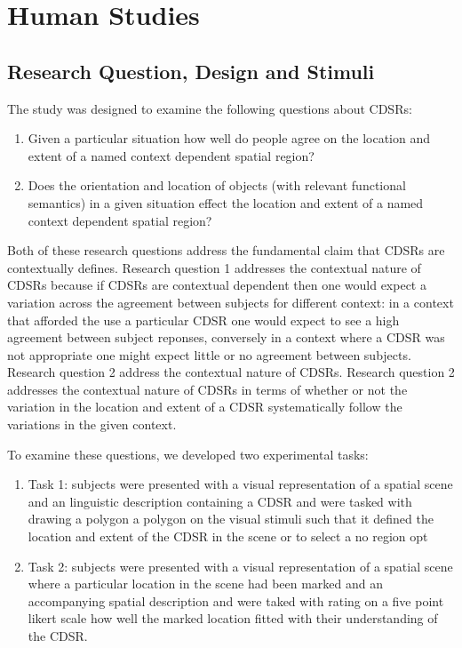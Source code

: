 \documentclass[11pt,letterpaper]{article}
\begin{document}
\section{Human Studies}

\subsection{Research Question, Design and Stimuli}

The study was designed to examine the following questions about CDSRs:
\begin{enumerate}
	\item Given a particular situation how well do people agree on the location and extent of a named context dependent spatial region?
	\item Does the orientation and location of objects (with relevant functional semantics) in a given situation effect the location and extent of a named context dependent spatial region?
\end{enumerate}

Both of these research questions address the fundamental claim that CDSRs are contextually defines. Research question 1 addresses the contextual nature of CDSRs because if CDSRs are contextual dependent then one would expect a variation across the agreement between subjects for different context: in a context that afforded the use a particular CDSR one would expect to see a high agreement between subject reponses, conversely in a context where a CDSR was not appropriate one might expect little or no agreement between subjects. Research question 2 address the contextual nature of CDSRs. Research question 2 addresses the contextual nature of CDSRs in terms of whether or not the variation in the location and extent of a CDSR systematically follow the variations  in the given context. 

To examine these questions, we developed two experimental tasks:
\begin{enumerate}
	\item Task 1: subjects were presented with a visual representation of a spatial scene and an linguistic description containing a CDSR and were tasked with drawing a polygon a polygon on the visual stimuli such that it defined the location and extent of the CDSR in the scene or to select a no region opt
	\item Task 2: subjects were presented with a visual representation of a spatial scene where a particular location in the scene had been marked and an accompanying spatial description and were taked with rating on a five point likert scale how well the marked location fitted with their understanding of the CDSR.
\end{enumerate}
\end{document}
